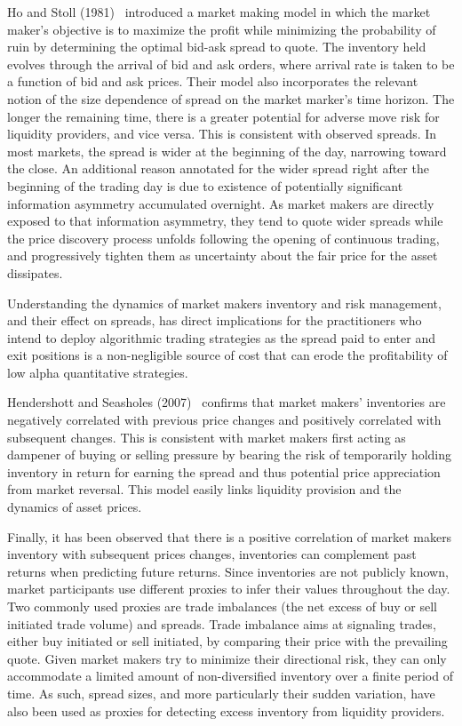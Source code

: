 Ho and Stoll (1981)~\cite{ho1981} introduced a market making model in which the market maker's objective is to maximize the profit while minimizing the probability of ruin by determining the optimal bid-ask spread to quote. The inventory held evolves through the arrival of bid and ask orders, where arrival rate is taken to be a function of bid and ask prices. Their model also incorporates the relevant notion of the size dependence of spread on the market marker's time horizon. The longer the remaining time, there is a greater potential for adverse move risk for liquidity providers, and vice versa. This is consistent with observed spreads. In most markets, the spread is wider at the beginning of the day, narrowing toward the close. An additional reason annotated for the wider spread right after the beginning of the trading day is due to existence of potentially significant information asymmetry accumulated overnight. As market makers are directly exposed to that information asymmetry, they tend to quote wider spreads while the price discovery process unfolds following the opening of continuous trading, and progressively tighten them as uncertainty about the fair price for the asset dissipates.


Understanding the dynamics of market makers inventory and risk management, and their effect on spreads, has direct implications for the practitioners who intend to deploy algorithmic trading strategies as the spread paid to enter and exit positions is a non-negligible source of cost that can erode the profitability of low alpha quantitative strategies. 


Hendershott and Seasholes (2007)~\cite{hendersea} confirms that market makers' inventories are negatively correlated with previous price changes and positively correlated with subsequent changes. This is consistent with market makers first acting as dampener of buying or selling pressure by bearing the risk of temporarily holding inventory in return for earning the spread and thus potential price appreciation from market reversal. This model easily links liquidity provision and the dynamics of asset prices. 


Finally, it has been observed that there is a positive correlation of market makers inventory with subsequent prices changes, inventories can complement past returns when predicting future returns. Since inventories are not publicly known, market participants use different proxies to infer their values throughout the day. Two commonly used proxies are trade imbalances (the net excess of buy or sell initiated trade volume) and spreads. Trade imbalance aims at signaling trades, either buy initiated or sell initiated, by comparing their price with the prevailing quote. Given market makers try to minimize their directional risk, they can only accommodate a limited amount of non-diversified inventory over a finite period of time. As such, spread sizes, and more particularly their sudden variation, have also been used as proxies for detecting excess inventory from liquidity providers.




